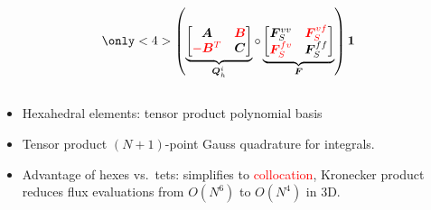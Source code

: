 \documentclass[compress]{beamer}
\theoremstyle{plain}
\newcommand{\LRp}[1]{\left( #1 \right)}
\renewcommand{\note}[1]{\textcolor{red}{{#1}}}
\begin{document}
{\begin{columns}
\begin{column}{.51\textwidth}
\[{}
\only<4>{
\LRp{\underbrace{\begin{bmatrix}
\bm{A} & \note{\bm{B}}\\
\note{-\bm{B}^T} & \bm{C}
\end{bmatrix}}_{\bm{Q}_h^i} \circ
\underbrace{\begin{bmatrix}
\bm{F}^{vv}_S & \note{\bm{F}^{vf}_S}\\
\note{\bm{F}^{fv}_S} & \bm{F}^{ff}_S
\end{bmatrix}}_{\bm{F}} } \bm{1}
}
\]
\end{column}
\end{columns}
\vspace{.5em}
\begin{itemize}
\item Hexahedral elements: tensor product polynomial basis
\vspace{.5em}
\item Tensor product $(N+1)$-point Gauss quadrature for integrals.
\vspace{.5em}
\item Advantage of hexes vs.\ tets: simplifies to \note{collocation}, Kronecker product reduces flux evaluations from $O(N^6)$ to $O(N^4)$ in 3D.
\vspace{.5em}
\end{itemize} 
}
\end{document}
